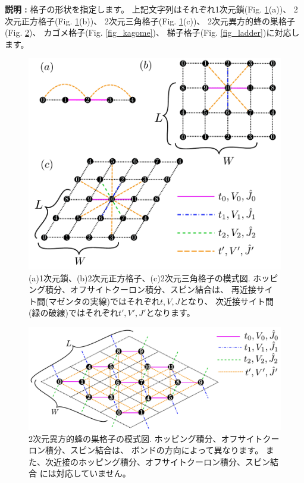\begin{itemize}
{\bf 説明 :} 格子の形状を指定します。
上記文字列はそれぞれ1次元鎖(Fig. \ref{fig_chap04_1_lattice}(a))、
2次元正方格子(Fig. \ref{fig_chap04_1_lattice}(b))、
2次元三角格子(Fig. \ref{fig_chap04_1_lattice}(c))、
2次元異方的蜂の巣格子(Fig. \ref{fig_chap04_1_honeycomb})、
カゴメ格子(Fig. \ref{fig_kagome})、
梯子格子(Fig. \ref{fig_ladder})に対応します。

\begin{figure}[!htbp]
  \begin{center}
    \includegraphics[width=15cm]{../figs/chap04_1_lattice.pdf}
    \caption{(a)1次元鎖、(b)2次元正方格子、(c)2次元三角格子の模式図. 
      ホッピング積分、オフサイトクーロン積分、スピン結合は、
      再近接サイト間(マゼンタの実線)ではそれぞれ$t,V,J$となり、
      次近接サイト間(緑の破線)ではそれぞれ$t',V',J'$となります。}
    \label{fig_chap04_1_lattice}
  \end{center}
\end{figure}

\begin{figure}[!htbp]
  \begin{center}
    \includegraphics[width=15cm]{../figs/chap04_1_honeycomb.pdf}
    \caption{2次元異方的蜂の巣格子の模式図. 
      ホッピング積分、オフサイトクーロン積分、スピン結合は、
      ボンドの方向によって異なります。
      また、次近接のホッピング積分、オフサイトクーロン積分、スピン結合
      には対応していません。
    }
    \label{fig_chap04_1_honeycomb}
  \end{center}
\end{figure}


\end{itemize}
